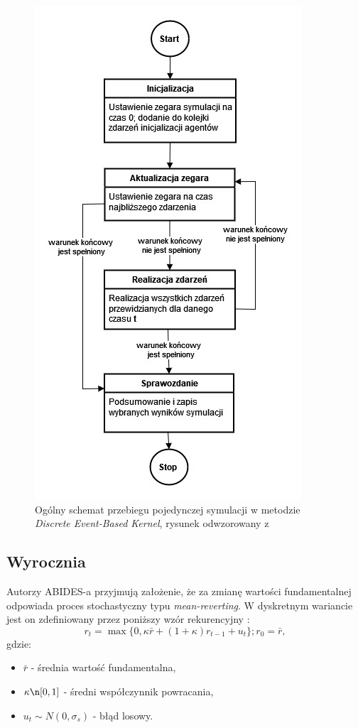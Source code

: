 \begin{center}
\begin{figure}
\begin{center}
\includegraphics[scale=0.75]{kernel_uml.jpg}
\end{center}
\caption{Ogólny schemat przebiegu pojedynczej symulacji w metodzie \textit{Discrete Event-Based Kernel}, rysunek odwzorowany z \cite{handbook_of_simulation}}\label{fig:kerneluml}
\end{figure}
\end{center}

\subsection{Wyrocznia}

Autorzy ABIDES-a przyjmują założenie, że za zmianę wartości fundamentalnej odpowiada proces stochastyczny typu \textit{mean-reverting}. W dyskretnym wariancie jest on zdefiniowany przez poniższy wzór rekurencyjny \cite{wahwellman}: 
$$r_t = \max\{0,\kappa \bar{r} + (1+\kappa) r_{t-1} + u_t\}; r_0 = \bar{r}, $$
gdzie:
\begin{itemize}
\item $\bar{r}$ - średnia wartość fundamentalna,
\item $\kappa \n [0,1]$ - średni współczynnik powracania,
\item $u_t \sim N(0,\sigma_s)$ - błąd losowy.
\end{itemize}

